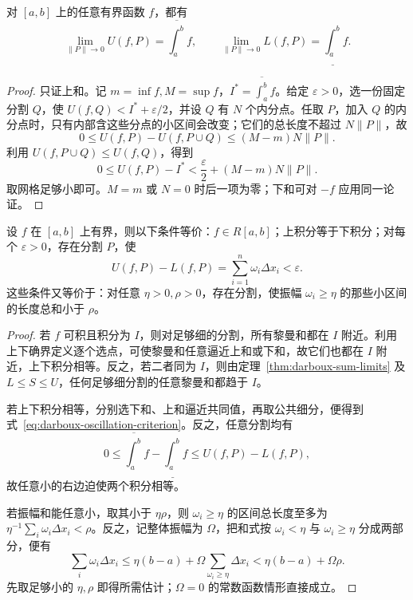 \begin{theorem}[达布定理]
\label{thm:darboux-sum-limits}
对 $[a,b]$ 上的任意有界函数 $f$，都有
\[
    \lim_{\|P\|\to0}U(f,P)=\overline{\int_a^b}f,\qquad
    \lim_{\|P\|\to0}L(f,P)=\underline{\int_a^b}f.
\]
\end{theorem}
\begin{proof}
只证上和。记 $m=\inf f,M=\sup f$，$I^*=\overline{\int_a^b}f$。给定 $\varepsilon>0$，选一份固定分割 $Q$，使 $U(f,Q)<I^*+\varepsilon/2$，并设 $Q$ 有 $N$ 个内分点。任取 $P$，加入 $Q$ 的内分点时，只有内部含这些分点的小区间会改变；它们的总长度不超过 $N\|P\|$，故
\[
    0\leq U(f,P)-U(f,P\cup Q)\leq(M-m)N\|P\|.
\]
利用 $U(f,P\cup Q)\leq U(f,Q)$，得到
\[
    0\leq U(f,P)-I^*
    <\frac{\varepsilon}{2}+(M-m)N\|P\|.
\]
取网格足够小即可。$M=m$ 或 $N=0$ 时后一项为零；下和可对 $-f$ 应用同一论证。
\end{proof}

\begin{theorem}[黎曼可积判据]
\label{thm:darboux-integrability-criteria}
设 $f$ 在 $[a,b]$ 上有界，则以下条件等价：$f\in R[a,b]$；上积分等于下积分；对每个 $\varepsilon>0$，存在分割 $P$，使
\begin{equation}
    U(f,P)-L(f,P)=\sum_{i=1}^n\omega_i\Delta x_i<\varepsilon.
    \label{eq:darboux-oscillation-criterion}
\end{equation}
这些条件又等价于：对任意 $\eta>0,\rho>0$，存在分割，使振幅 $\omega_i\geq\eta$ 的那些小区间的长度总和小于 $\rho$。
\end{theorem}
\begin{proof}
若 $f$ 可积且积分为 $I$，则对足够细的分割，所有黎曼和都在 $I$ 附近。利用上下确界定义逐个选点，可使黎曼和任意逼近上和或下和，故它们也都在 $I$ 附近，上下积分相等。反之，若二者同为 $I$，则由定理~\ref{thm:darboux-sum-limits} 及 $L\leq S\leq U$，任何足够细分割的任意黎曼和都趋于 $I$。

若上下积分相等，分别选下和、上和逼近共同值，再取公共细分，便得到式~\eqref{eq:darboux-oscillation-criterion}。反之，任意分割均有
\[
    0\leq\overline{\int_a^b}f-\underline{\int_a^b}f
    \leq U(f,P)-L(f,P),
\]
故任意小的右边迫使两个积分相等。

若振幅和能任意小，取其小于 $\eta\rho$，则 $\omega_i\geq\eta$ 的区间总长度至多为 $\eta^{-1}\sum_i\omega_i\Delta x_i<\rho$。反之，记整体振幅为 $\Omega$，把和式按 $\omega_i<\eta$ 与 $\omega_i\geq\eta$ 分成两部分，便有
\[
    \sum_i\omega_i\Delta x_i
    \leq\eta(b-a)+\Omega\sum_{\omega_i\geq\eta}\Delta x_i
    <\eta(b-a)+\Omega\rho.
\]
先取足够小的 $\eta,\rho$ 即得所需估计；$\Omega=0$ 的常数函数情形直接成立。
\end{proof}

